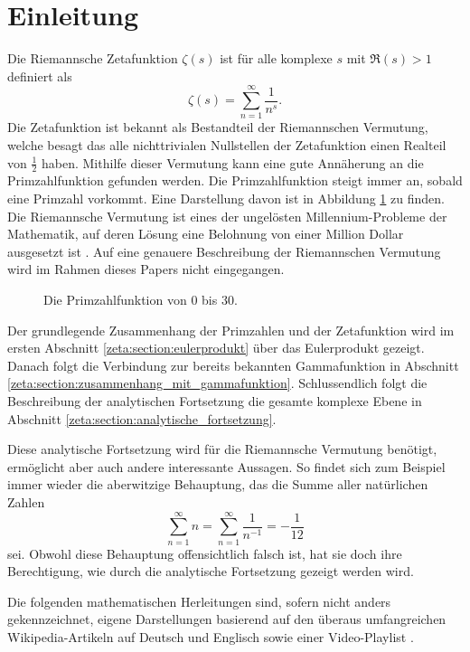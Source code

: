 \section{Einleitung} \label{zeta:section:einleitung}

Die Riemannsche Zetafunktion $\zeta(s)$ ist für alle komplexe $s$ mit $\Re(s) > 1$ definiert als
\begin{equation}\label{zeta:equation1}
    \zeta(s)
    =
    \sum_{n=1}^{\infty}
    \frac{1}{n^s}.
\end{equation}
Die Zetafunktion ist bekannt als Bestandteil der Riemannschen Vermutung, welche besagt das alle nichttrivialen Nullstellen der Zetafunktion einen Realteil von $\frac{1}{2}$ haben.
Mithilfe dieser Vermutung kann eine gute Annäherung an die Primzahlfunktion gefunden werden.
Die Primzahlfunktion steigt immer an, sobald eine Primzahl vorkommt.
Eine Darstellung davon ist in Abbildung \ref{fig:zeta:primzahlfunktion} zu finden.
Die Riemannsche Vermutung ist eines der ungelösten Millennium-Probleme der Mathematik, auf deren Lösung eine Belohnung von einer Million Dollar ausgesetzt ist \cite{zeta:online:millennium}.
Auf eine genauere Beschreibung der Riemannschen Vermutung wird im Rahmen dieses Papers nicht eingegangen.
\begin{figure}
    \centering
    
    \caption{Die Primzahlfunktion von $0$ bis $30$.}
    \label{fig:zeta:primzahlfunktion}
\end{figure}

Der grundlegende Zusammenhang der Primzahlen und der Zetafunktion wird im ersten Abschnitt \ref{zeta:section:eulerprodukt} über das Eulerprodukt gezeigt.
Danach folgt die Verbindung zur bereits bekannten Gammafunktion in Abschnitt \ref{zeta:section:zusammenhang_mit_gammafunktion}.
Schlussendlich folgt die Beschreibung der analytischen Fortsetzung die gesamte komplexe Ebene in Abschnitt \ref{zeta:section:analytische_fortsetzung}.

Diese analytische Fortsetzung wird für die Riemannsche Vermutung benötigt, ermöglicht aber auch andere interessante Aussagen.
So findet sich zum Beispiel immer wieder die aberwitzige Behauptung, das die Summe aller natürlichen Zahlen
\begin{equation*}
    \sum_{n=1}^{\infty} n
    =
    \sum_{n=1}^{\infty}
    \frac{1}{n^{-1}}
    =
    -\frac{1}{12}
\end{equation*}
sei.
Obwohl diese Behauptung offensichtlich falsch ist, hat sie doch ihre Berechtigung, wie durch die analytische Fortsetzung gezeigt werden wird.

Die folgenden mathematischen Herleitungen sind, sofern nicht anders gekennzeichnet, eigene Darstellungen basierend auf den überaus umfangreichen Wikipedia-Artikeln auf Deutsch \cite{zeta:online:wiki_de} und Englisch \cite{zeta:online:wiki_en} sowie einer Video-Playlist \cite{zeta:online:mryoumath}.
